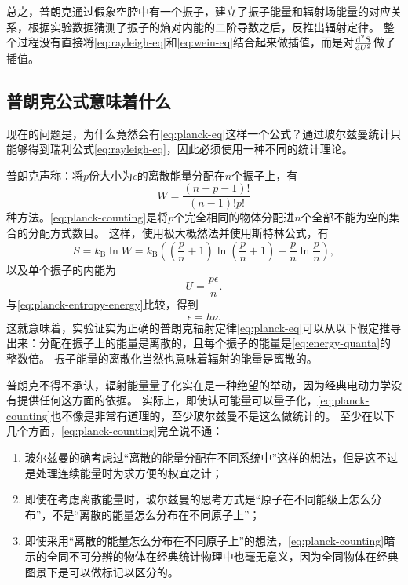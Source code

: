 \documentclass[UTF8, a4paper]{ctexart}
\begin{document}
总之，普朗克通过假象空腔中有一个振子，建立了振子能量和辐射场能量的对应关系，根据实验数据猜测了振子的熵对内能的二阶导数之后，反推出辐射定律。
整个过程没有直接将\eqref{eq:rayleigh-eq}和\eqref{eq:wein-eq}结合起来做插值，而是对$\dv[2]{S}{U}$做了插值。

\subsection{普朗克公式意味着什么}

现在的问题是，为什么竟然会有\eqref{eq:planck-eq}这样一个公式？通过玻尔兹曼统计只能够得到瑞利公式\eqref{eq:rayleigh-eq}，因此必须使用一种不同的统计理论。

普朗克声称：将$p$份大小为$\epsilon$的离散能量分配在$n$个振子上，有
\begin{equation}
    W = \frac{(n+p-1)!}{(n-1)!p!}
    \label{eq:planck-counting}
\end{equation}
种方法。\eqref{eq:planck-counting}是将$p$个完全相同的物体分配进$n$个全部不能为空的集合的分配方式数目。
这样，使用极大概然法并使用斯特林公式，有
\[
    S = k_\text{B} \ln W = k_\text{B} \left( \left(\frac{p}{n} + 1\right) \ln \left(\frac{p}{n} + 1 \right) - \frac{p}{n} \ln \frac{p}{n} \right),
\]
以及单个振子的内能为
\[
    U = \frac{p \epsilon}{n}.
\]
与\eqref{eq:planck-entropy-energy}比较，得到
\begin{equation}
    \epsilon = h \nu.
    \label{eq:energy-quanta}
\end{equation}
这就意味着，实验证实为正确的普朗克辐射定律\eqref{eq:planck-eq}可以从以下假定推导出来：分配在振子上的能量是离散的，且每个振子的能量是\eqref{eq:energy-quanta}的整数倍。
振子能量的离散化当然也意味着辐射的能量是离散的。

普朗克不得不承认，辐射能量量子化实在是一种绝望的举动，因为经典电动力学没有提供任何这方面的依据。
实际上，即使认可能量可以量子化，\eqref{eq:planck-counting}也不像是非常有道理的，至少玻尔兹曼不是这么做统计的。
至少在以下几个方面，\eqref{eq:planck-counting}完全说不通：
\begin{enumerate}
    \item 玻尔兹曼的确考虑过“离散的能量分配在不同系统中”这样的想法，但是这不过是处理连续能量时为求方便的权宜之计；
    \item 即使在考虑离散能量时，玻尔兹曼的思考方式是“原子在不同能级上怎么分布”，不是“离散的能量怎么分布在不同原子上”；
    \item 即使采用“离散的能量怎么分布在不同原子上”的想法，\eqref{eq:planck-counting}暗示的全同不可分辨的物体在经典统计物理中也毫无意义，因为全同物体在经典图景下是可以做标记以区分的。
\end{enumerate}
\end{document}

